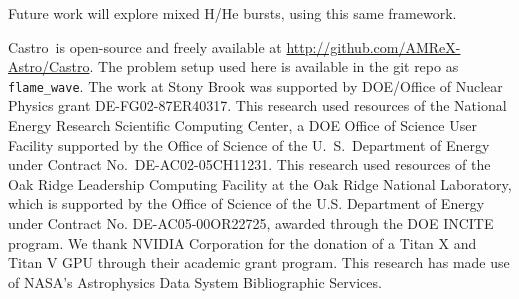 \documentclass[twocolumn,times,tighten]{aastex631}
\newcommand{\castro}{{\sf Castro}}
\begin{document}
Future work will explore mixed H/He bursts, using this same framework.

\begin{acknowledgements}
\castro\ is open-source and freely available at
\url{http://github.com/AMReX-Astro/Castro}.  The problem setup used
here is available in the git repo as {\tt flame\_wave}.  The work at
Stony Brook was supported by DOE/Office of Nuclear Physics grant
DE-FG02-87ER40317.  This research used resources of the National
Energy Research Scientific Computing Center, a DOE Office of Science
User Facility supported by the Office of Science of the
U.~S.\ Department of Energy under Contract No.\ DE-AC02-05CH11231.
This research used resources of the Oak Ridge Leadership Computing
Facility at the Oak Ridge National Laboratory, which is supported by
the Office of Science of the U.S. Department of Energy under Contract
No. DE-AC05-00OR22725, awarded through the DOE INCITE program.  We
thank NVIDIA Corporation for the donation of a Titan X and Titan V GPU
through their academic grant program.  This research has made use of
NASA's Astrophysics Data System Bibliographic Services.
\end{acknowledgements}








\end{document}
